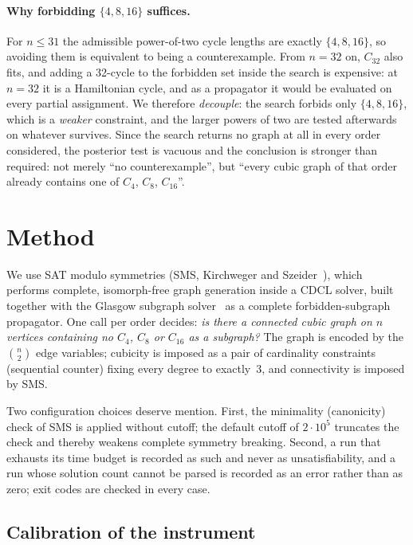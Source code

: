 \documentclass[11pt]{article}
\begin{document}
\paragraph{Why forbidding $\{4,8,16\}$ suffices.}
For $n\le 31$ the admissible power-of-two cycle lengths are exactly
$\{4,8,16\}$, so avoiding them is equivalent to being a counterexample. From
$n=32$ on, $C_{32}$ also fits, and adding a 32-cycle to the forbidden set
inside the search is expensive: at $n=32$ it is a Hamiltonian cycle, and as a
propagator it would be evaluated on every partial assignment. We therefore
\emph{decouple}: the search forbids only $\{4,8,16\}$, which is a
\emph{weaker} constraint, and the larger powers of two are tested afterwards
on whatever survives. Since the search returns no graph at all in every order
considered, the posterior test is vacuous and the conclusion is stronger than
required: not merely ``no counterexample'', but ``every cubic graph of that
order already contains one of $C_4$, $C_8$, $C_{16}$''.

\section{Method}

We use SAT modulo symmetries (SMS, Kirchweger and Szeider~\cite{sms}), which
performs complete, isomorph-free graph generation inside a CDCL solver, built
together with the Glasgow subgraph solver~\cite{glasgow} as a complete
forbidden-subgraph propagator. One call per order decides: \emph{is there a
connected cubic graph on $n$ vertices containing no $C_4$, $C_8$ or $C_{16}$
as a subgraph?} The graph is encoded by the $\binom n2$ edge variables; cubicity
is imposed as a pair of cardinality constraints (sequential counter) fixing
every degree to exactly~3, and connectivity is imposed by SMS.

Two configuration choices deserve mention. First, the minimality (canonicity)
check of SMS is applied without cutoff; the default cutoff of $2\cdot10^5$
truncates the check and thereby weakens complete symmetry breaking. Second, a
run that exhausts its time budget is recorded as such and never as
unsatisfiability, and a run whose solution count cannot be parsed is recorded
as an error rather than as zero; exit codes are checked in every case.

\subsection{Calibration of the instrument}
\end{document}
